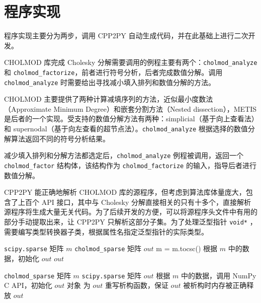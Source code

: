 \section{程序实现}

程序实现主要分为两步，调用 CPP2PY 自动生成代码，并在此基础上进行二次开发。

CHOLMOD\cite{chen2008algorithm, davis2008user} 库完成 Cholesky 分解需要调用的例程主要有两个：\lstinline{cholmod_analyze} 和 \lstinline{cholmod_factorize}，前者进行符号分析，后者完成数值分解。调用 \lstinline{cholmod_analyze} 时需要给出寻找减小填入排列和数值分解的方法。

CHOLMOD 主要提供了两种计算减填序列的方法，近似最小度数法（Approximate Minimum Degree）和嵌套分割方法（Nested dissection），METIS 是后者的一个实现。受支持的数值分解方法有两种：simplicial（基于向上查看法）和 supernodal（基于向左查看的超节点法）。\lstinline{cholmod_analyze} 根据选择的数值分解算法返回不同的符号分析结果。

减少填入排列和分解方法都选定后，\lstinline{cholmod_analyze} 例程被调用，返回一个 \lstinline{cholmod_factor} 结构体，该结构作为 \lstinline{cholmod_factorize} 的输入，指导后者进行数值分解。

CPP2PY 能正确地解析 CHOLMOD 库的源程序，但考虑到算法库体量庞大，包含了上百个 API 接口，其中与 Cholesky 分解直接相关的只有十多个，直接解析源程序将生成大量无关代码。为了后续开发的方便，可以将源程序头文件中有用的部分手动提取出来，让 CPP2PY 只解析这部分子集。为了处理泛型指针 \lstinline{void*} ，需要编写类型转换器子类，根据属性名指定泛型指针的实际类型。

\begin{algorithm}
  \caption{将 \lstinline$scipy.sparse$ 稀疏矩阵转换为 \lstinline$cholmod_sparse$}
  \label{alg3}
  \small
  \begin{algorithmic}
  \REQUIRE \lstinline$scipy.sparse$ 矩阵 $m$
  \ENSURE \lstinline$cholmod_sparse$ 矩阵 $out$
    \STATE m = m.tocsc()
  \ENDIF
  \STATE 根据 $m$ 中的数据，初始化 $out$
  \RETURN $out$
  \end{algorithmic}
\end{algorithm}


\begin{algorithm}
  \caption{将 \lstinline$cholmod_sparse$ 稀疏矩阵转换为 \lstinline$scipy.sparse$}
  \label{alg4}
  \small
  \begin{algorithmic}
  \REQUIRE \lstinline$cholmod_sparse$ 矩阵 $m$
  \ENSURE \lstinline$scipy.sparse$ 矩阵 $out$
  \STATE 根据 $m$ 中的数据，调用 NumPy C API，初始化 $out$ 对象
  \STATE 为 $out$ 重写析构函数，保证 $out$ 被析构时内存被正确释放
  \RETURN $out$
  \end{algorithmic}
\end{algorithm}

